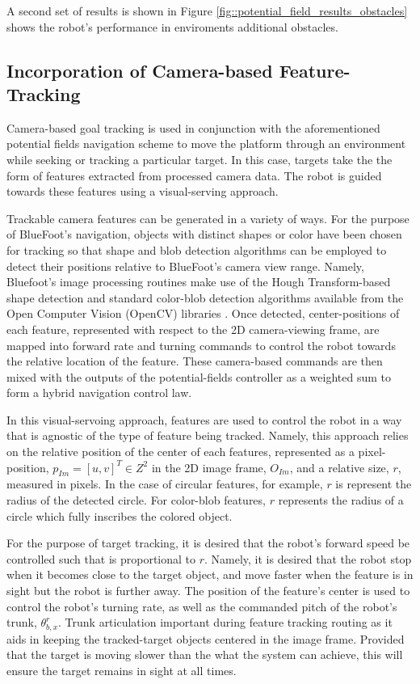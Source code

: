 			A second set of results is shown in Figure \ref{fig::potential_field_results_obstacles} shows the robot's performance in enviroments additional obstacles.

		\subsection{Incorporation of Camera-based Feature-Tracking}
		
			Camera-based goal tracking is used in conjunction with the aforementioned potential fields navigation scheme to move the platform through an environment while seeking or tracking a particular target. In this case, targets take the the form of features extracted from processed camera data. The robot is guided towards these features using a visual-serving approach. 

			Trackable camera features can be generated in a variety of ways. For the purpose of BlueFoot's navigation, objects with distinct shapes or color have been chosen for tracking so that shape and blob detection algorithms can be employed to detect their positions relative to BlueFoot's camera view range. Namely, Bluefoot's image processing routines make use of the Hough Transform-based shape detection and standard color-blob detection algorithms available from the Open Computer Vision (OpenCV) libraries \cite{opencv_library}. Once detected, center-positions of each feature, represented with respect to the 2D camera-viewing frame, are mapped into forward rate and turning commands to control the robot towards the relative location of the feature. These camera-based commands are then mixed with the outputs of the potential-fields controller as a weighted sum to form a hybrid navigation control law.

			In this visual-servoing approach, features are used to control the robot in a way that is agnostic of the type of feature being tracked. Namely, this approach relies on the relative position of the center of each features, represented as a pixel-position, $p_{Im} = [u,v]^{T} \in Z^{2}$ in the 2D image frame, $O_{Im}$, and a relative size, $r$, measured in pixels. In the case of circular features, for example, $r$ is represent the radius of the detected circle. For color-blob features, $r$ represents the radius of a circle which fully inscribes the colored object.

			For the purpose of target tracking, it is desired that the robot's forward speed be controlled such that is proportional to $r$. Namely, it is desired that the robot stop when it becomes close to the target object, and move faster when the feature is in sight but the robot is further away. The position of the feature's center is used to control the robot's turning rate, as well as the commanded pitch of the robot's trunk, $\theta_{b,x}^{r}$. Trunk articulation important during feature tracking routing as it aids in keeping the tracked-target objects centered in the image frame. Provided that the target is moving slower than the what the system can achieve, this will ensure the target remains in sight at all times.


